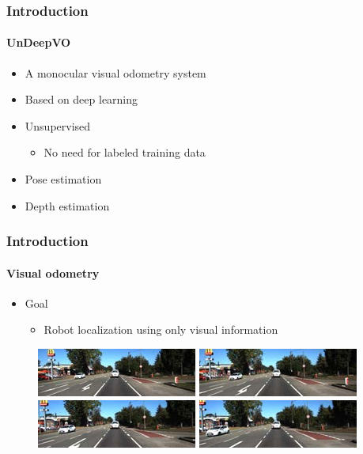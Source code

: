 \begin{frame}
    \frametitle{Introduction}
    \framesubtitle{UnDeepVO}
    \begin{itemize}
        \item A monocular visual odometry system
        \item Based on deep learning
        \item Unsupervised
        \begin{itemize}
            \item No need for labeled training data
        \end{itemize}
        \item Pose estimation
        \item Depth estimation
    \end{itemize}
\end{frame}

\begin{frame}
    \frametitle{Introduction}
    \framesubtitle{Visual odometry}
    \begin{itemize}
        \item Goal
        \begin{itemize}
            \item Robot localization using only visual information
        \end{itemize}
    \end{itemize}
    \begin{figure}
        \includegraphics[scale=0.8]{images/road1.png}
        \includegraphics[scale=0.8]{images/road2.png}
        \includegraphics[scale=0.8]{images/road3.png}
        \includegraphics[scale=0.8]{images/road4.png}
    \end{figure}
\end{frame}

